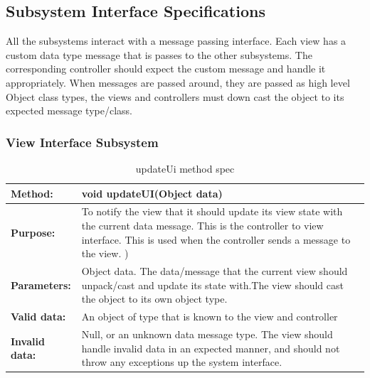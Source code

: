 \documentclass[12pt]{article}
\begin{document}
\subsection{Subsystem Interface Specifications}
All the subsystems interact with a message passing interface. Each view has a custom data type message that is passes to the other subsystems. The corresponding controller should expect the custom message and handle it appropriately. When messages are passed around, they are passed as high level Object class types, the views and controllers must down cast the object to its expected message type/class.

\subsubsection{View Interface Subsystem}

\begin{table}[H]
  \caption{updateUi method spec}
  \begin{center}
    \begin{tabular}{|l|p{10cm}|}

      \hline
      \bf Method: & void updateUI(Object data)\\
		\hline
      \bf Purpose: & To notify the view that it should update its view state with the current data message.
This is the controller to view interface. This is used when the controller sends a message to the view.
)\\
\hline
      \bf Parameters: & Object data. The data/message that the current view should unpack/cast and update its state with.The view should cast the object to its own object type.\\
		\hline
      \bf Valid data: &  An object of type that is known to the view and controller\\
      \hline
      \bf Invalid data: &  Null, or an unknown data message type. The view should handle invalid data in an expected manner, and should not throw any exceptions up the system interface.\\
      \hline

    \end{tabular}
  \end{center}
\end{table}
\end{document}
